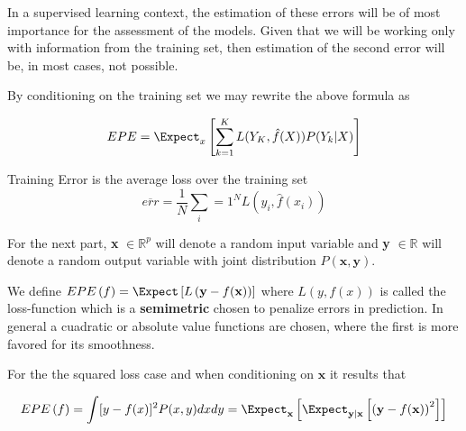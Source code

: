 In a supervised learning context, the estimation of these errors will be of most importance for the assessment of the models.  Given  that we will be working only with information from the training set, then estimation of the second error will be, in most cases, not possible.

By conditioning on the training set we may rewrite the above formula as 

\begin{equation}\label{classificationEPE}
	 EPE = \Expect_x\left[ \sum_{k=1}^{K} L( Y_K , \hat{f}(X) ) P(Y_k|X) \right]
\end{equation}


\begin{definition}{Training Error}
	is the average loss over the training set
	$$ \overline{err} = \frac{1}{N} \sum_i=1^N L(y_i, \hat{f}(x_i) )$$
\end{definition}



For the next part, \textbf{x} $\in \mathbb{R}^{p}$ will denote a random input variable and \textbf{y}  $\in \mathbb{R}$ will denote a random output variable with joint distribution $P\left(\textbf{x},\textbf{y}\right)$.

We define $EPE\left(f \right) = \Expect\left[L\left(\textbf{y} - f(\textbf{x}) \right) \right] $ where $L(y,f\left(x\right))$ is called the loss-function which is a \textbf{semimetric} chosen to penalize errors in prediction. In general a cuadratic or absolute value functions are chosen, where the first is more favored for its smoothness. 

For the the squared loss case and when conditioning on $\textbf{x}$ it results that

\begin{equation} \label{eq:expectedError}
EPE\left(f \right) = \int [y - f(x)]^2 P(x,y)dxdy

\\
= \Expect_{\textbf{x}} \left[ \Expect_{\textbf{y}|\textbf{x}} \left[  \left( \textbf{y} - f(\textbf{x})  \right)^2 \right]  \right]

\end{equation}


